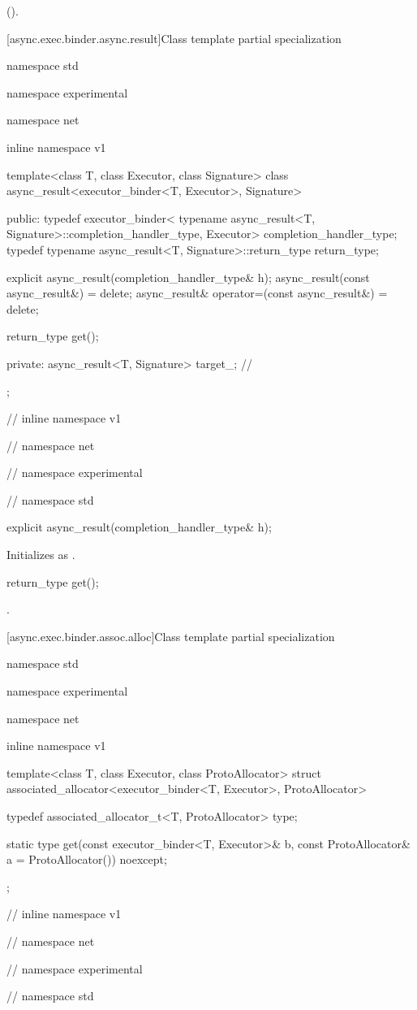\begin{itemdescr}
\pnum
\returns {} ().
\end{itemdescr}



[async.exec.binder.async.result]{Class template partial specialization }

\begin{codeblock}
namespace std {
namespace experimental {
namespace net {
inline namespace v1 {

  template<class T, class Executor, class Signature>
  class async_result<executor_binder<T, Executor>, Signature>
  {
  public:
    typedef executor_binder<
      typename async_result<T, Signature>::completion_handler_type,
        Executor> completion_handler_type;
    typedef typename async_result<T, Signature>::return_type return_type;

    explicit async_result(completion_handler_type& h);
    async_result(const async_result&) = delete;
    async_result& operator=(const async_result&) = delete;

    return_type get();

  private:
    async_result<T, Signature> target_; // \expos
  };

} // inline namespace v1
} // namespace net
} // namespace experimental
} // namespace std
\end{codeblock}

\begin{itemdecl}
explicit async_result(completion_handler_type& h);
\end{itemdecl}

\begin{itemdescr}
\pnum
\effects Initializes  as .
\end{itemdescr}

\begin{itemdecl}
return_type get();
\end{itemdecl}

\begin{itemdescr}
\pnum
\returns {}.
\end{itemdescr}



[async.exec.binder.assoc.alloc]{Class template partial specialization }

\begin{codeblock}
namespace std {
namespace experimental {
namespace net {
inline namespace v1 {

  template<class T, class Executor, class ProtoAllocator>
    struct associated_allocator<executor_binder<T, Executor>, ProtoAllocator>
  {
    typedef associated_allocator_t<T, ProtoAllocator> type;

    static type get(const executor_binder<T, Executor>& b,
                    const ProtoAllocator& a = ProtoAllocator()) noexcept;
  };

} // inline namespace v1
} // namespace net
} // namespace experimental
} // namespace std
\end{codeblock}


